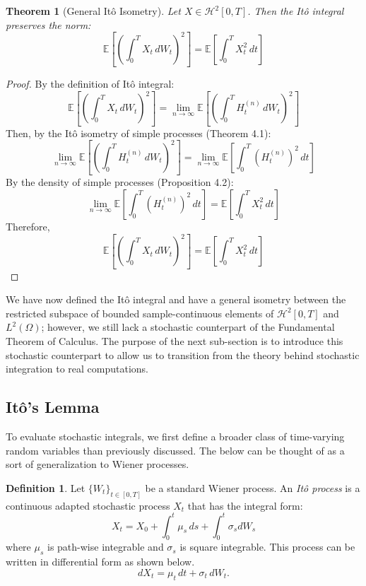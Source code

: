 \documentclass[12pt]{article}
\theoremstyle{definition}
\newtheorem{definition}{Definition}[section]
\theoremstyle{plain}
\newtheorem{theorem}{Theorem}[section]
\theoremstyle{remark}
\begin{document}
\begin{theorem}[General It\^o Isometry]
Let $X \in \mathcal{H}^2[0,T]$. Then the It\^o integral preserves the norm:
\[
\mathbb{E} \left[ \left(\int_0^T X_t \, dW_t \right)^2 \right] = \mathbb{E} \left[ \int_0^T X_t^2 \, dt \right]
\]
\end{theorem}

\begin{proof}
By the definition of It\^o integral:
\[
\mathbb{E} \left[ \left(\int_0^T X_t \, dW_t \right)^2 \right] = \lim_{n \to \infty} \mathbb{E} \left[ \left( \int_0^T H^{(n)}_t \, dW_t \right)^2 \right]
\]
Then, by the It\^o isometry of simple processes (Theorem 4.1):
\[
\lim_{n \to \infty} \mathbb{E} \left[ \left( \int_0^T H^{(n)}_t \, dW_t \right)^2 \right] = \lim_{n \to \infty}\mathbb{E} \left[ \int_0^T \left( H_t^{(n)} \right)^2 \, dt \right]
\]
By the density of simple processes (Proposition 4.2):
\[
\lim_{n \to \infty}\mathbb{E} \left[ \int_0^T \left( H_t^{(n)} \right)^2 \, dt \right] = \mathbb{E} \left[ \int_0^T X_t^2 \, dt \right]
\]
Therefore,
\[
\mathbb{E} \left[ \left(\int_0^T X_t \, dW_t \right)^2 \right] = \mathbb{E} \left[ \int_0^T X_t^2 \, dt \right]
\]
\end{proof}

We have now defined the It\^o integral and have a general isometry between the restricted subspace of bounded sample-continuous elements of $\mathcal{H}^2[0,T]$ and $L^2(\Omega)$; however, we still lack a stochastic counterpart of the Fundamental Theorem of Calculus.  The purpose of the next sub-section is to introduce this stochastic counterpart to allow us to transition from the theory behind stochastic integration to real computations.

\subsection{It\^o's Lemma}

To evaluate stochastic integrals, we first define a broader class of time-varying random variables than previously discussed.  The below can be thought of as a sort of generalization to Wiener processes.

\begin{definition}
Let $\{W_t\}_{t \in [0,T]}$ be a standard Wiener process. An \textit{It\^o process} is a continuous adapted stochastic process $X_t$ that has the integral form:
\[
X_t = X_0 + \int_0^t\mu_s \, ds + \int_0^t \sigma_s dW_s
\]
where $\mu_s$ is path-wise integrable and $\sigma_s$ is square integrable.  This process can be written in differential form as shown below.
\[
dX_t = \mu_t \, dt + \sigma_t \, dW_t.
\]
\end{definition}
\end{document}
